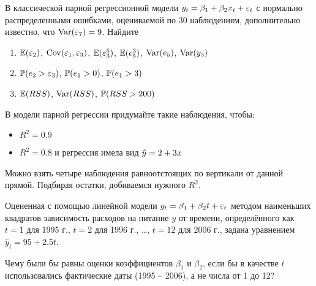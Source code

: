 \documentclass[pdftex,11pt,openany]{book}\usepackage[]{graphicx}\usepackage[]{color}
\begin{document}
\begin{problem}
 В классической парной регрессионной модели $y_i = \beta_1 + \beta_2 x_i + \e_i$ с нормально распределенными ошибками, оцениваемой по 30 наблюдениям, дополнительно известно, что $\Var(\e_7)=9$. Найдите
\begin{enumerate}
\item $\E(\e_2)$, $\Cov(\e_1,\e_3)$, $\E(\e_3^5)$, $\E(e_5^3)$, $\Var(e_5)$, $\Var(y_3)$
\item $\P(e_2>\e_3)$, $\P(e_1>0)$, $\P(e_1>3)$
\item $\E(RSS)$, $\Var(RSS)$, $\P(RSS>200)$
\end{enumerate}
\end{problem}

\begin{solution}
\end{solution}


\begin{problem}
В модели парной регрессии придумайте такие наблюдения, чтобы:
\begin{itemize}
\item $R^2=0.9$
\item $R^2=0.8$ и регрессия имела вид $\hy=2+3x$
\end{itemize}
\end{problem}

\begin{solution}
 Можно взять четыре наблюдения равноотстоящих по вертикали от данной прямой. Подбирая остатки, добиваемся нужного $R^2$. 
 \end{solution}



\begin{problem}
Оцененная с помощью линейной модели $y_t = \beta_1 + \beta_2 t + \e_t$ методом наименьших квадратов зависимость расходов на питание $y$ от времени, определённого как $t = 1$ для 1995 г., $t = 2$ для 1996 г., \ldots, $t = 12$ для 2006 г., задана уравнением $\hat{y}_t = 95 + 2.5 t$.

Чему были бы равны оценки коэффициентов $\beta_1$ и $\beta_2$, если бы в качестве $t$ использовались фактические даты (1995 – 2006), а не числа от 1 до 12? 
\end{problem}
\end{document}

